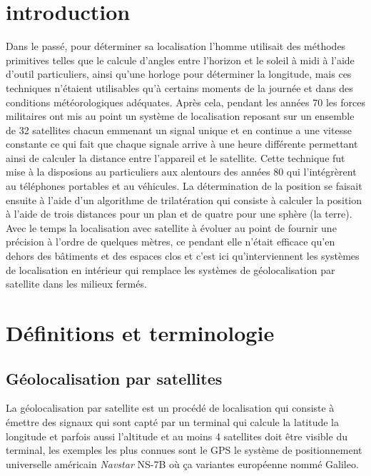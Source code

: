 \documentclass[12pt,a4paper]{report}
\begin{document}
\section{introduction}

Dans le passé, pour déterminer sa localisation l'homme utilisait des méthodes primitives telles que le calcule d'angles entre l'horizon et le soleil à midi à l'aide d'outil particuliers, ainsi qu'une horloge pour déterminer la longitude, mais ces techniques n'étaient utilisables qu'à certains moments de la journée et dans des conditions météorologiques adéquates. Après cela, pendant les années 70 les forces militaires ont mis au point un système de localisation reposant sur un ensemble de 32 satellites chacun emmenant un signal unique et en continue a une vitesse constante ce qui fait que chaque signale arrive à une heure différente permettant ainsi de calculer la distance entre l'appareil et le satellite. Cette technique fut mise à la disposions au particuliers aux alentours des années 80 qui l'intégrèrent au téléphones portables et au véhicules. La détermination de la position se faisait ensuite à l'aide d'un algorithme de trilatération qui consiste à calculer la position à l'aide de trois distances pour un plan et de quatre pour une sphère (la terre). Avec le temps la localisation avec satellite à évoluer au point de fournir une précision à l'ordre de quelques mètres, ce pendant elle n'était efficace qu'en dehors des bâtiments et des espaces clos et c'est ici qu'interviennent les systèmes de localisation en intérieur qui remplace les systèmes de géolocalisation par satellite dans les milieux fermés.

\section{Définitions et terminologie }

\subsection{Géolocalisation par satellites}

La géolocalisation par satellite est un procédé de localisation qui consiste à émettre des signaux qui sont capté par un terminal qui calcule la latitude la longitude et parfois aussi l'altitude et au moins 4 satellites doit être visible du terminal, les exemples les plus connues sont le GPS le système de positionnement universelle américain \textit{Navstar} NS-7B où ça variantes européenne nommé Galileo.
\end{document}
